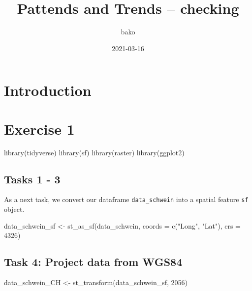 \documentclass[
]{book}
\title{Pattends and Trends -- checking}
\author{bako}
\date{2021-03-16}
\newenvironment{Shaded}{\begin{snugshade}}{\end{snugshade}}
\newcommand{\AttributeTok}[1]{\textcolor[rgb]{0.77,0.63,0.00}{#1}}
\newcommand{\DecValTok}[1]{\textcolor[rgb]{0.00,0.00,0.81}{#1}}
\newcommand{\FunctionTok}[1]{\textcolor[rgb]{0.00,0.00,0.00}{#1}}
\newcommand{\NormalTok}[1]{#1}
\newcommand{\OtherTok}[1]{\textcolor[rgb]{0.56,0.35,0.01}{#1}}
\newcommand{\StringTok}[1]{\textcolor[rgb]{0.31,0.60,0.02}{#1}}
\begin{document}
\maketitle

{
\setcounter{tocdepth}{1}
\tableofcontents
}
\hypertarget{introduction}{%
\chapter{Introduction}\label{introduction}}

\hypertarget{exercise-1}{%
\chapter{Exercise 1}\label{exercise-1}}

\begin{Shaded}
\begin{Highlighting}[]
\FunctionTok{library}\NormalTok{(tidyverse)}
\FunctionTok{library}\NormalTok{(sf)}
\FunctionTok{library}\NormalTok{(raster)}
\FunctionTok{library}\NormalTok{(ggplot2)}
\end{Highlighting}
\end{Shaded}

\hypertarget{tasks-1---3}{%
\section{Tasks 1 - 3}\label{tasks-1---3}}

As a next task, we convert our dataframe \texttt{data\_schwein} into a spatial feature \texttt{sf} object.

\begin{Shaded}
\begin{Highlighting}[]
\NormalTok{data\_schwein\_sf }\OtherTok{\textless{}{-}} \FunctionTok{st\_as\_sf}\NormalTok{(data\_schwein, }\AttributeTok{coords =} \FunctionTok{c}\NormalTok{(}\StringTok{"Long"}\NormalTok{, }\StringTok{"Lat"}\NormalTok{),}
                            \AttributeTok{crs =} \DecValTok{4326}\NormalTok{)}
\end{Highlighting}
\end{Shaded}

\hypertarget{task-4-project-data-from-wgs84}{%
\section{Task 4: Project data from WGS84}\label{task-4-project-data-from-wgs84}}

\begin{Shaded}
\begin{Highlighting}[]
\NormalTok{data\_schwein\_CH }\OtherTok{\textless{}{-}} \FunctionTok{st\_transform}\NormalTok{(data\_schwein\_sf, }\DecValTok{2056}\NormalTok{)}
\end{Highlighting}
\end{Shaded}
\end{document}

